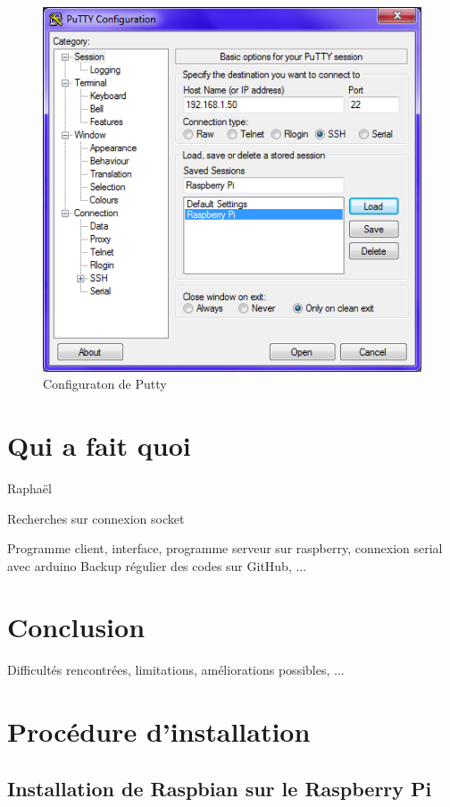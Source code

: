 \documentclass[12pt,a4paper]{report}
\begin{document}
\begin{figure}[hf!]
\center
\includegraphics[scale=0.7]{images/Screen/Putty.png}
\caption{Configuraton de Putty}
\end{figure}



\chapter{Qui a fait quoi}

Raphaël

Recherches sur connexion socket

Programme client, interface, programme serveur sur raspberry, connexion serial avec arduino
Backup régulier des codes sur GitHub, ...

\chapter{Conclusion}

Difficultés rencontrées, limitations, améliorations possibles, ...

\appendix

\chapter{Procédure d'installation}

\section{Installation de Raspbian sur le Raspberry Pi}
\end{document}
